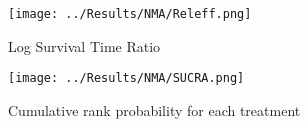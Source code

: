 \begin{figure}[h]
    \centering
    \texttt{[image: ../Results/NMA/Releff.png]}
    \caption{Log Survival Time Ratio}
    \label{fig:releff}
\end{figure}

\begin{figure}[h]
    \centering
    \texttt{[image: ../Results/NMA/SUCRA.png]}
    \caption{Cumulative rank probability for each treatment}
    \label{fig:sucra}
\end{figure}